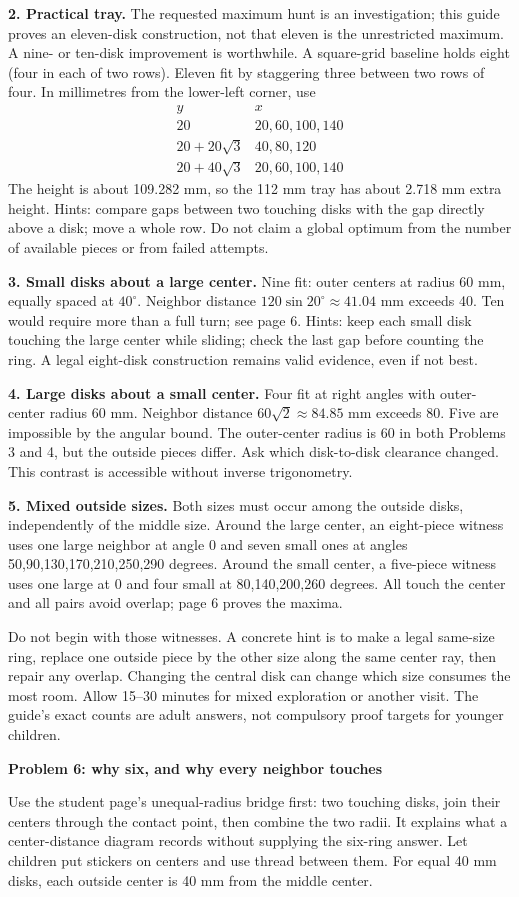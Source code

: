 \documentclass[11pt]{article}
\newcommand{\heading}[1]{\par\textbf{#1}\par}
\begin{document}
\textbf{2. Practical tray.} The requested maximum hunt is an investigation; this guide proves an eleven-disk construction, not that eleven is the unrestricted maximum. A nine- or ten-disk improvement is worthwhile. A square-grid baseline holds eight (four in each of two rows). Eleven fit by staggering three between two rows of four. In millimetres from the lower-left corner, use
\[
\begin{array}{c|c}
y&x\\\hline
20&20,60,100,140\\
20+20\sqrt 3&40,80,120\\
20+40\sqrt 3&20,60,100,140
\end{array}
\]
The height is about 109.282 mm, so the 112 mm tray has about 2.718 mm extra height. Hints: compare gaps between two touching disks with the gap directly above a disk; move a whole row. Do not claim a global optimum from the number of available pieces or from failed attempts.

\textbf{3. Small disks about a large center.} Nine fit: outer centers at radius 60 mm, equally spaced at $40^\circ$. Neighbor distance $120\sin 20^\circ\approx 41.04$ mm exceeds 40. Ten would require more than a full turn; see page 6. Hints: keep each small disk touching the large center while sliding; check the last gap before counting the ring. A legal eight-disk construction remains valid evidence, even if not best.

\textbf{4. Large disks about a small center.} Four fit at right angles with outer-center radius 60 mm. Neighbor distance $60\sqrt 2\approx 84.85$ mm exceeds 80. Five are impossible by the angular bound. The outer-center radius is 60 in both Problems 3 and 4, but the outside pieces differ. Ask which disk-to-disk clearance changed. This contrast is accessible without inverse trigonometry.

\textbf{5. Mixed outside sizes.} Both sizes must occur among the outside disks, independently of the middle size. Around the large center, an eight-piece witness uses one large neighbor at angle 0 and seven small ones at angles 50,90,130,170,210,250,290 degrees. Around the small center, a five-piece witness uses one large at 0 and four small at 80,140,200,260 degrees. All touch the center and all pairs avoid overlap; page 6 proves the maxima.

Do not begin with those witnesses. A concrete hint is to make a legal same-size ring, replace one outside piece by the other size along the same center ray, then repair any overlap. Changing the central disk can change which size consumes the most room. Allow 15--30 minutes for mixed exploration or another visit. The guide's exact counts are adult answers, not compulsory proof targets for younger children.
\newpage
\heading{Problem 6: why six, and why every neighbor touches}
Use the student page's unequal-radius bridge first: two touching disks, join their centers through the contact point, then combine the two radii. It explains what a center-distance diagram records without supplying the six-ring answer. Let children put stickers on centers and use thread between them. For equal 40 mm disks, each outside center is 40 mm from the middle center.
\end{document}
